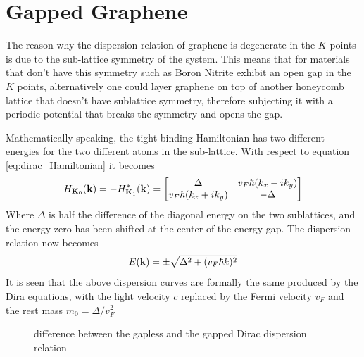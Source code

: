 \section{Gapped Graphene}
The reason why the dispersion relation of graphene is degenerate in the $K$ points is due to the sub-lattice symmetry of the system. This means that for materials that don't have this symmetry such as Boron Nitrite exhibit an open gap in the $K$ points, alternatively one could layer graphene on top of another honeycomb lattice that doesn't have sublattice symmetry, therefore subjecting it with a periodic potential that breaks the symmetry and opens the gap.

Mathematically speaking, the tight binding Hamiltonian has two different energies for the two different atoms in the sub-lattice. With respect to equation \ref{eq:dirac_Hamiltonian} it becomes
\begin{equation}
    H_{\mathbf{K}_0}(\mathbf{k})=
    -H^*_{\mathbf{K}_1}(\mathbf{k})=
    \begin{bmatrix}
        \Delta& v_F\hbar(k_x-ik_y)\\
        v_F\hbar(k_x+ik_y)&-\Delta
    \end{bmatrix}
    \label{eq:gapped-dirac}
\end{equation}
Where $\Delta$ is half the difference of the diagonal energy on the two sublattices, and the energy zero has been shifted at the center of the energy gap. The dispersion relation now becomes
\begin{equation}
    E(\mathbf{k})=\pm\sqrt{\Delta^2 + (v_F\hbar k)^2}
\end{equation}
It is seen that the above dispersion curves are formally the same produced by the Dira equations, with the light velocity $c$ replaced by the Fermi velocity $v_F$ and the rest mass $m_0=\Delta/v_F^2$

\begin{figure}[h]
    \caption{difference between the gapless and the gapped Dirac dispersion relation}
    \label{fig:dispersion-1D}
\end{figure}